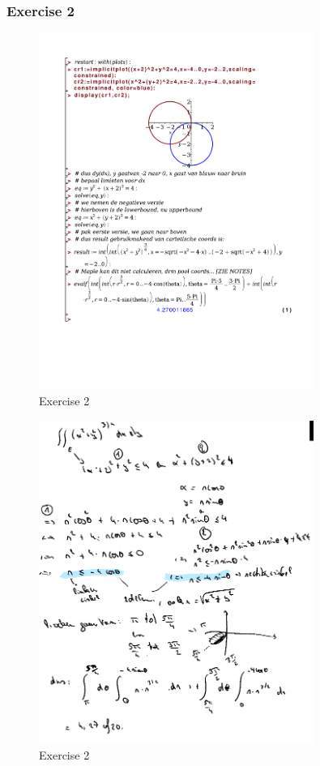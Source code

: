 \documentclass[a4paper]{report}
\begin{document}
\subsubsection{Exercise 2}

\begin{figure}[H]
	\centering
	\includegraphics[width=0.8\textwidth]{exercises/bord_5_ex_2.pdf}
	\caption{Exercise 2}
	\label{fig:bord_5_ex_2_maple}
\end{figure}

\begin{figure}[H]
	\centering
	\includegraphics[width=0.8\textwidth]{assets/bord_5_ex_2.png}
	\caption{Exercise 2}
	\label{fig:bord_5_ex_2}
\end{figure}
\end{document}
